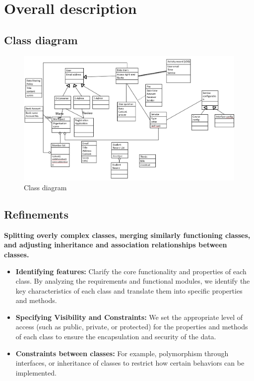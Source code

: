 \chapter{Overall description}
\section{Class diagram}
\begin{figure}[H]
    \centering
    \includegraphics[width=0.75\linewidth]{picture/2-1/2-1-1.jpg}
    \caption{Class diagram}
    \label{fig:enter-label}
\end{figure} 

\section{Refinements}

\textbf{Splitting overly complex classes, merging similarly functioning classes, and adjusting inheritance and association relationships between classes.}

\begin{itemize}
    \item \textbf{Identifying features:} Clarify the core functionality and properties of each class. By analyzing the requirements and functional modules, we identify the key characteristics of each class and translate them into specific properties and methods.
    \item \textbf{Specifying Visibility and Constraints:} We set the appropriate level of access (such as public, private, or protected) for the properties and methods of each class to ensure the encapsulation and security of the data.
    \item \textbf{Constraints between classes:} For example, polymorphism through interfaces, or inheritance of classes to restrict how certain behaviors can be implemented.
\end{itemize}

